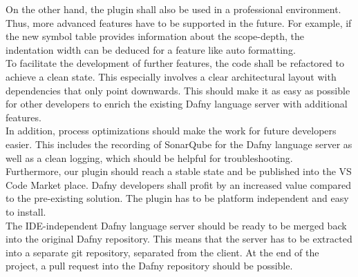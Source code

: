On the other hand, the plugin shall also be used in a professional environment.
Thus, more advanced features have to be supported in the future.
For example, if the new symbol table provides information about the scope-depth, the indentation width can be deduced for a feature like auto formatting.\\

To facilitate the development of further features, the code shall be refactored to achieve a clean state.
This especially involves a clear architectural layout with dependencies that only point downwards.
This should make it as easy as possible for other developers to enrich the existing Dafny language server with additional features. \\

In addition, process optimizations should make the work for future developers easier.
This includes the recording of SonarQube for the Dafny language server as well as a clean logging,
which should be helpful for troubleshooting.\\

Furthermore, our plugin should reach a stable state and be published into the VS Code Market place.
Dafny developers shall profit by an increased value compared to the pre-existing solution.
The plugin has to be platform independent and easy to install. \\

The IDE-independent Dafny language server should be ready to be merged back into the original Dafny repository.
This means that the server has to be extracted into a separate git repository, separated from the client.
At the end of the project, a pull request into the Dafny repository should be possible.
